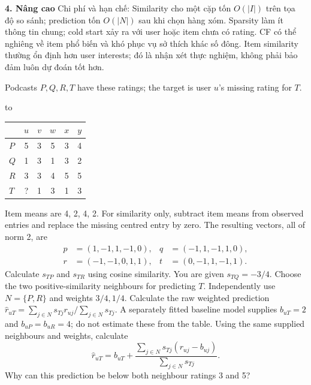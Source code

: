 \documentclass[10pt,a4paper,twocolumn]{article}
\newcommand{\key}[1]{#1:\enspace}
\newenvironment{examtable}[1]{%
  \par\addvspace{2pt}\noindent\hbox to \linewidth\bgroup\hfil
  \setlength{\tabcolsep}{4pt}%
  \renewcommand{\arraystretch}{1.12}\begin{tabular}{#1}%
}{\end{tabular}\hfil\egroup\par\addvspace{2pt}}
\newcommand{\unitheading}[2]{%
  \par\addvspace{1pt}\noindent\textbf{#1. #2}\enspace}
\newcommand{\unitadvanced}{\unitheading{4}{Nâng cao}}
\begin{document}
\unitadvanced
\key{Chi phí và hạn chế} Similarity cho một cặp tốn $O(|I|)$ trên tọa độ so sánh; prediction tốn $O(|N|)$ sau khi chọn hàng xóm. Sparsity làm ít thông tin chung; cold start xảy ra với user hoặc item chưa có rating. CF có thể nghiêng về item phổ biến và khó phục vụ sở thích khác số đông. Item similarity thường ổn định hơn user interests; đó là nhận xét thực nghiệm, không phải bảo đảm luôn dự đoán tốt hơn.


Podcasts $P,Q,R,T$ have these ratings; the target is user $u$'s missing rating for $T$.
\begin{examtable}{@{}lccccc@{}}
\toprule
& $u$ & $v$ & $w$ & $x$ & $y$\\
\midrule
$P$ & 5 & 3 & 5 & 3 & 4\\
$Q$ & 1 & 3 & 1 & 3 & 2\\
$R$ & 3 & 3 & 4 & 5 & 5\\
$T$ & ? & 1 & 3 & 1 & 3\\
\bottomrule
\end{examtable}
Item means are 4, 2, 4, 2. For similarity only, subtract item means from observed entries and replace the missing centred entry by zero. The resulting vectors, all of norm 2, are
\[
\begin{aligned}
p&=(1,-1,1,-1,0), &q&=(-1,1,-1,1,0),\\
r&=(-1,-1,0,1,1), &t&=(0,-1,1,-1,1).
\end{aligned}
\]
 Calculate $s_{TP}$ and $s_{TR}$ using cosine similarity. You are given $s_{TQ}=-3/4$. Choose the two positive-similarity neighbours for predicting $T$.
 Independently use $N=\{P,R\}$ and weights $3/4,1/4$. Calculate the raw weighted prediction $\hat r_{uT}=\sum_{j\in N}s_{Tj}r_{uj}/\sum_{j\in N}s_{Tj}$.
 A separately fitted baseline model supplies $b_{uT}=2$ and $b_{uP}=b_{uR}=4$; do not estimate these from the table. Using the same supplied neighbours and weights, calculate
\[
\hat r_{uT}=b_{uT}+\frac{\sum_{j\in N}s_{Tj}(r_{uj}-b_{uj})}{\sum_{j\in N}s_{Tj}}.
\]
Why can this prediction be below both neighbour ratings 3 and 5?
\end{document}
